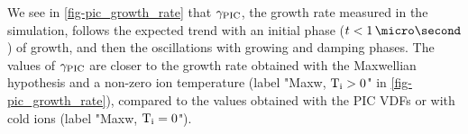     We see in \cref{fig-pic_growth_rate} that $\gamma_{\rm PIC}$, the growth rate measured in the simulation, follows the expected trend with an initial phase ($t<1\,\micro\second$) of growth, and then the oscillations with growing and damping phases.
    The values of $\gamma_{\rm PIC}$ are closer to the growth rate obtained with the Maxwellian hypothesis and a non-zero ion temperature (label "Maxw, $\mathrm{T_i}>0$" in \cref{fig-pic_growth_rate}), compared to the values obtained with the \ac{PIC} VDFs or with cold ions (label "Maxw, $\mathrm{T_i}=0$").
      
      
    
  \FloatBarrier